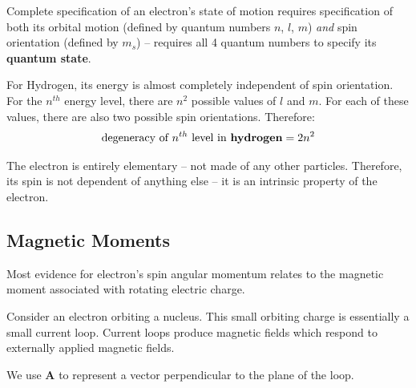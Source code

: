 \documentclass[10pt]{article}
\begin{document}
Complete specification of an electron's state of motion requires specification of both its orbital motion (defined by quantum numbers $n$, $l$, $m$) \textit{and} spin orientation (defined by $m_s$) -- requires all 4 quantum numbers to specify its \textbf{quantum state}. 

For Hydrogen, its energy is almost completely independent of spin orientation. For the $n^{th}$ energy level, there are $n^2$ possible values of $l$ and $m$. For each of these values, there are also two possible spin orientations. Therefore:
\begin{align}
    \text{degeneracy of $n^{th}$ level in \textbf{hydrogen}} = 2n^2
\end{align}

The electron is entirely elementary -- not made of any other particles. Therefore, its spin is not dependent of anything else -- it is an intrinsic property of the electron.



\subsection{Magnetic Moments}
Most evidence for electron's spin angular momentum relates to the magnetic moment associated with rotating electric charge. 

Consider an electron orbiting a nucleus. This small orbiting charge is essentially a small current loop. Current loops produce magnetic fields which respond to externally applied magnetic fields.

We use $\mathbf{A}$ to represent a vector perpendicular to the plane of the loop. 
\end{document}

